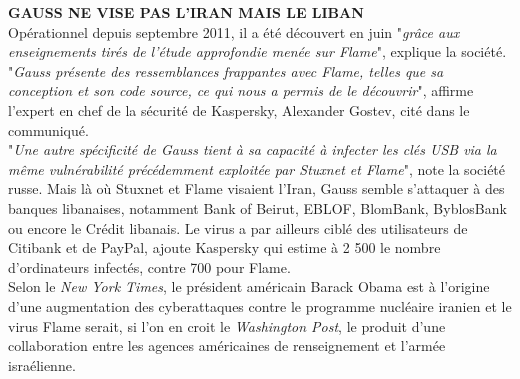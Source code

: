 \documentclass[11pt,twoside,a4paper]{article}
\begin{document}
\textbf{GAUSS NE VISE PAS L'IRAN MAIS LE LIBAN}~\\

Op{\'e}rationnel depuis septembre 2011, il a {\'e}t{\'e} d{\'e}couvert en juin "\emph{gr{\^a}ce aux enseignements tir{\'e}s de l'{\'e}tude approfondie men{\'e}e sur Flame}", explique la soci{\'e}t{\'e}. "\emph{Gauss pr{\'e}sente des ressemblances frappantes avec Flame, telles que sa conception et son code source, ce qui nous a permis de le d{\'e}couvrir}", affirme l'expert en chef de la s{\'e}curit{\'e} de Kaspersky, Alexander Gostev, cit{\'e} dans le communiqu{\'e}.~\\

"\emph{Une autre sp{\'e}cificit{\'e} de Gauss tient {\`a} sa capacit{\'e} {\`a} infecter les cl{\'e}s USB via la m{\^e}me vuln{\'e}rabilit{\'e} pr{\'e}c{\'e}demment exploit{\'e}e par Stuxnet et Flame}", note la soci{\'e}t{\'e} russe. Mais l{\`a} o{\`u} Stuxnet et Flame visaient l'Iran, Gauss semble s'attaquer {\`a} des banques libanaises, notamment Bank of Beirut, EBLOF, BlomBank, ByblosBank ou encore le Cr{\'e}dit libanais. Le virus a par ailleurs cibl{\'e} des utilisateurs de Citibank et de PayPal, ajoute Kaspersky qui estime {\`a} 2 500 le nombre d'ordinateurs infect{\'e}s, contre 700 pour Flame.~\\

Selon le \emph{New York Times}, le pr{\'e}sident am{\'e}ricain Barack Obama est {\`a} l'origine d'une augmentation des cyberattaques contre le programme nucl{\'e}aire iranien et le virus Flame serait, si l'on en croit le \emph{Washington Post}, le produit d'une collaboration entre les agences am{\'e}ricaines de renseignement et l'arm{\'e}e isra{\'e}lienne.~\\
\end{document}

